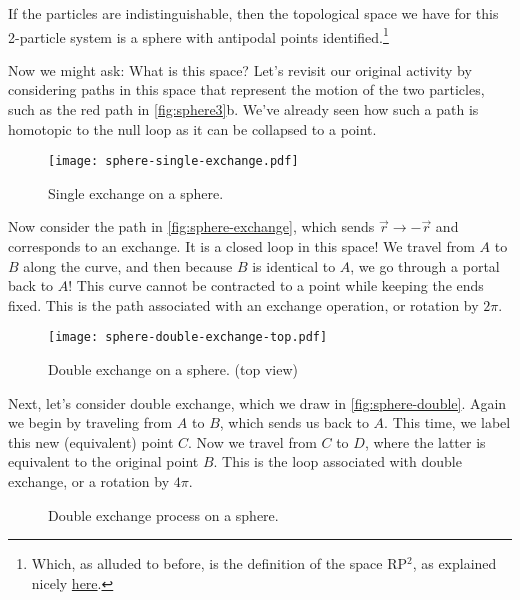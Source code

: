 \documentclass[12pt, english]{book}
\begin{document}
If the particles are indistinguishable, then the topological space we have for this 2-particle system is a sphere with antipodal points identified.\footnote{Which, as alluded to before, is the definition of the space RP$^2$, as explained nicely \href{https://www.popmath.org.uk/sculpmath/pagesm/plane.html}{here}.}

Now we might ask: What is this space?
Let's revisit our original activity by considering paths in this space that represent the motion of the two particles, such as the red path in \autoref{fig:sphere3}b.
We've already seen how such a path is homotopic to the null loop as it can be collapsed to a point.

\begin{figure}[!ht]
	\centering 
	\texttt{[image: sphere-single-exchange.pdf]}
	\caption{Single exchange on a sphere.}
	\label{fig:sphere-exchange}
\end{figure}

Now consider the path in \autoref{fig:sphere-exchange}, which sends $\vec{r} \rightarrow -\vec{r}$ and corresponds to an exchange.
It is a closed loop in this space!
We travel from $A$ to $B$ along the curve, and then because $B$ is identical to $A$, we go through a portal back to $A$! 
This curve cannot be contracted to a point while keeping the ends fixed.
This is the path associated with an exchange operation, or rotation by $2\pi$.

\begin{figure}[!ht]
	\centering 
	\texttt{[image: sphere-double-exchange-top.pdf]}
	\caption{Double exchange on a sphere. (top view)}
	\label{fig:sphere-double}
\end{figure}

Next, let's consider double exchange, which we draw in \autoref{fig:sphere-double}. 
Again we begin by traveling from $A$ to $B$, which sends us back to $A$.
This time, we label this new (equivalent) point $C$.
Now we travel from $C$ to $D$, where the latter is equivalent to the original point $B$. 
This is the loop associated with double exchange, or a rotation by $4\pi$.

\begin{figure}[!ht]
	\centering 
	 \hfill
	 \hfill
	 \hfill
	\caption{Double exchange process on a sphere.}
	\label{fig:sphere-double2}
\end{figure}
\end{document}
